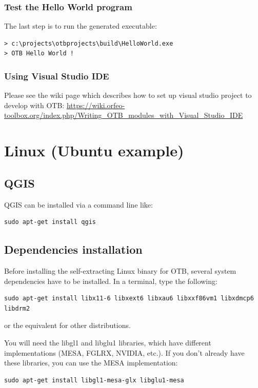 \documentclass[10pt,a4paper]{article}
\begin{document}
\subsubsection{Test the Hello World program}

The last step is to run the generated executable:

\begin{verbatim}
> c:\projects\otbprojects\build\HelloWorld.exe
> OTB Hello World !
\end{verbatim}

\subsubsection{Using Visual Studio IDE}\label{ide}

Please see the wiki page which describes how to set up visual studio project to
develop with OTB:
\url{https://wiki.orfeo-toolbox.org/index.php/Writing_OTB_modules_with_Visual_Studio_IDE}

\clearpage
\section{Linux (Ubuntu example)}


\subsection{QGIS}
QGIS can be installed via a command line like:
\begin{verbatim}
sudo apt-get install qgis
\end{verbatim}

\subsection{Dependencies installation}
Before installing the self-extracting Linux binary for OTB, several system dependencies have to be installed. In a terminal, type the following:
\begin{verbatim}
sudo apt-get install libx11-6 libxext6 libxau6 libxxf86vm1 libxdmcp6 libdrm2
\end{verbatim}
or the equivalent for other distributions.

You will need the libgl1 and libglu1 libraries, which have different implementations (MESA, FGLRX, NVIDIA, etc.). If you don't already have these libraries, you can use the MESA implementation:
\begin{verbatim}
sudo apt-get install libgl1-mesa-glx libglu1-mesa
\end{verbatim}
\end{document}
